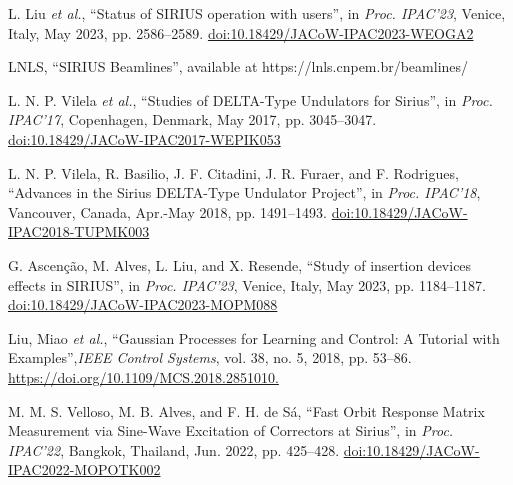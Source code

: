 \documentclass[a4paper,
               keeplastbox,   %
               ]{jacow}
\begin{document}
\begin{thebibliography}{14} %

   L. Liu \emph{et al.},
   \textquotedblleft{Status of SIRIUS operation with users}\textquotedblright,
   in \emph{Proc. IPAC’23}, Venice, Italy, May 2023, pp. 2586--2589.
   \url{doi:10.18429/JACoW-IPAC2023-WEOGA2}    
    

    LNLS,
    \textquotedblleft{SIRIUS Beamlines}\textquotedblright,
    available at https://lnls.cnpem.br/beamlines/

    L. N. P. Vilela \emph{et al.},
    \textquotedblleft{Studies of DELTA-Type Undulators for Sirius}\textquotedblright,
    in \emph{Proc. IPAC’17}, Copenhagen, Denmark, May 2017, pp. 3045--3047.
    \url{doi:10.18429/JACoW-IPAC2017-WEPIK053} 
    
   L. N. P. Vilela, R. Basilio, J. F. Citadini, J. R. Furaer, and F. Rodrigues,
   \textquotedblleft{Advances in the Sirius DELTA-Type Undulator Project}\textquotedblright,
   in \emph{Proc. IPAC’18}, Vancouver, Canada, Apr.-May 2018, pp. 1491--1493.
   \url{doi:10.18429/JACoW-IPAC2018-TUPMK003}  

   G. Ascenção, M. Alves, L. Liu, and X. Resende,
   \textquotedblleft{Study of insertion devices effects in SIRIUS}\textquotedblright,
   in \emph{Proc. IPAC’23}, Venice, Italy, May 2023, pp. 1184--1187.
   \url{doi:10.18429/JACoW-IPAC2023-MOPM088}    

    Liu, Miao \emph{et al.},  
    \textquotedblleft{Gaussian Processes for Learning and Control: A Tutorial with Examples}\textquotedblright,\emph{IEEE Control Systems}, vol. 38, no. 5, 2018, pp. 53–86.
    \url{https://doi.org/10.1109/MCS.2018.2851010. }

   M. M. S. Velloso, M. B. Alves, and F. H. de Sá,
   \textquotedblleft{Fast Orbit Response Matrix Measurement via Sine-Wave Excitation of Correctors at Sirius}\textquotedblright,
   in \emph{Proc. IPAC’22}, Bangkok, Thailand, Jun. 2022, pp. 425--428.
   \url{doi:10.18429/JACoW-IPAC2022-MOPOTK002}  
   

\end{thebibliography}
\end{document}
